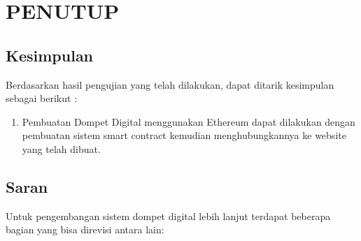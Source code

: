 \chapter{PENUTUP}
\label{chap:penutup}


\section{Kesimpulan}
\label{sec:kesimpulan}

Berdasarkan hasil pengujian yang telah dilakukan, dapat ditarik kesimpulan sebagai berikut :

\begin{enumerate}[nolistsep]

  \item Pembuatan Dompet Digital menggunakan Ethereum dapat dilakukan dengan pembuatan sistem smart contract kemudian menghubungkannya ke website yang telah dibuat.

\end{enumerate}

\section{Saran}
\label{chap:saran}

Untuk pengembangan sistem dompet digital lebih lanjut terdapat beberapa bagian yang bisa direvisi antara lain:

